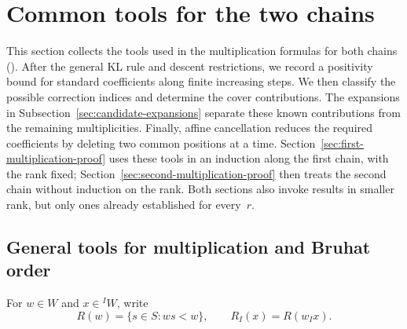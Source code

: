 \documentclass[11pt,a4paper,reqno]{amsart}
\numberwithin{equation}{section}
\theoremstyle{definition}
\theoremstyle{remark}
\theoremstyle{plain}
\begin{document}
\section{Common tools for the two chains}
\label{sec:corrections}
This section collects the tools used in the multiplication formulas for both chains ().
After the general KL rule and descent restrictions, we record a positivity
bound for standard coefficients along finite increasing steps.
We then classify the possible correction indices and determine the cover
contributions. The expansions in Subsection~\ref{sec:candidate-expansions}
separate these known contributions from the remaining multiplicities.
Finally, affine cancellation reduces the required coefficients by deleting
two common positions at a time. Section~\ref{sec:first-multiplication-proof}
uses these tools in an induction along the first chain, with the rank fixed;
Section~\ref{sec:second-multiplication-proof} then treats the second chain
without induction on the rank. Both sections also invoke results in smaller
rank, but only ones already established for every~$r$.

\subsection{General tools for multiplication and Bruhat order}
\label{sec:standard-multiplication-rule}
For $w\in W$ and $x\in{}^I W$, write
\[
 R(w)=\{s\in S:ws<w\},\qquad R_I(x)=R(w_Ix).
\]
\end{document}
